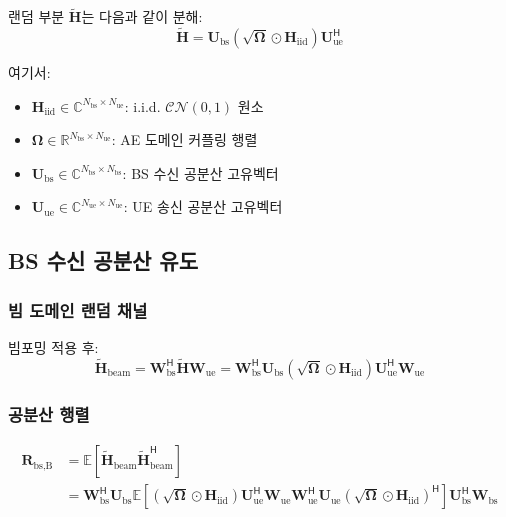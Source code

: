 \documentclass[10pt]{article}
\begin{document}
랜덤 부분 $\tilde{\mathbf{H}}$는 다음과 같이 분해:
\begin{equation}
\tilde{\mathbf{H}} = \mathbf{U}_{\text{bs}} (\sqrt{\boldsymbol{\Omega}} \odot \mathbf{H}_{\text{iid}}) \mathbf{U}_{\text{ue}}^{\mathsf{H}}
\end{equation}

여기서:
\begin{itemize}
    \item $\mathbf{H}_{\text{iid}} \in \mathbb{C}^{N_{\text{bs}} \times N_{\text{ue}}}$: i.i.d. $\mathcal{CN}(0,1)$ 원소
    \item $\boldsymbol{\Omega} \in \mathbb{R}^{N_{\text{bs}} \times N_{\text{ue}}}$: AE 도메인 커플링 행렬
    \item $\mathbf{U}_{\text{bs}} \in \mathbb{C}^{N_{\text{bs}} \times N_{\text{bs}}}$: BS 수신 공분산 고유벡터
    \item $\mathbf{U}_{\text{ue}} \in \mathbb{C}^{N_{\text{ue}} \times N_{\text{ue}}}$: UE 송신 공분산 고유벡터
\end{itemize}

\subsection{BS 수신 공분산 유도}

\subsubsection{빔 도메인 랜덤 채널}
빔포밍 적용 후:
\begin{equation}
\tilde{\mathbf{H}}_{\text{beam}} = \mathbf{W}_{\text{bs}}^{\mathsf{H}} \tilde{\mathbf{H}} \mathbf{W}_{\text{ue}} = \mathbf{W}_{\text{bs}}^{\mathsf{H}} \mathbf{U}_{\text{bs}} (\sqrt{\boldsymbol{\Omega}} \odot \mathbf{H}_{\text{iid}}) \mathbf{U}_{\text{ue}}^{\mathsf{H}} \mathbf{W}_{\text{ue}}
\end{equation}

\subsubsection{공분산 행렬}
\begin{align}
\mathbf{R}_{\text{bs,B}} &= \mathbb{E}[\tilde{\mathbf{H}}_{\text{beam}} \tilde{\mathbf{H}}_{\text{beam}}^{\mathsf{H}}] \\
&= \mathbf{W}_{\text{bs}}^{\mathsf{H}} \mathbf{U}_{\text{bs}} \mathbb{E}\left[ (\sqrt{\boldsymbol{\Omega}} \odot \mathbf{H}_{\text{iid}}) \mathbf{U}_{\text{ue}}^{\mathsf{H}} \mathbf{W}_{\text{ue}} \mathbf{W}_{\text{ue}}^{\mathsf{H}} \mathbf{U}_{\text{ue}} (\sqrt{\boldsymbol{\Omega}} \odot \mathbf{H}_{\text{iid}})^{\mathsf{H}} \right] \mathbf{U}_{\text{bs}}^{\mathsf{H}} \mathbf{W}_{\text{bs}}
\end{align}
\end{document}
